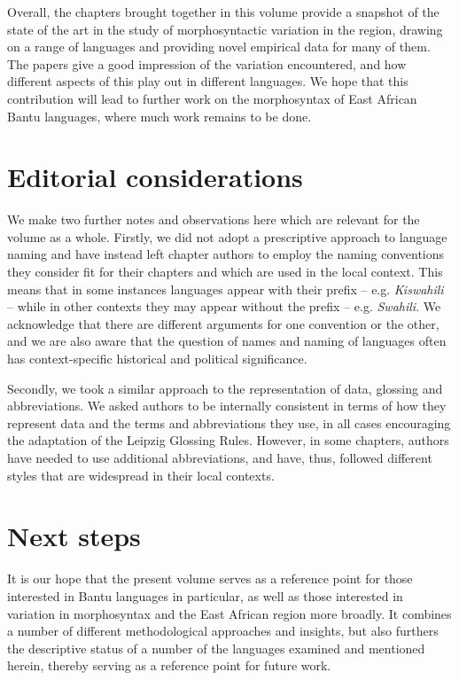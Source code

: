 \documentclass[output=paper]{langscibook}
\begin{document}
Overall, the chapters brought together in this volume provide a snapshot of the state of the art in the study of morphosyntactic variation in the region, drawing on a range of languages and providing novel empirical data for many of them. The papers give a good impression of the variation encountered, and how different aspects of this play out in different languages. We hope that this contribution will lead to further work on the morphosyntax of East African Bantu languages, where much work remains to be done. 

\section{Editorial considerations}\largerpage

We make two further notes and observations here which are relevant for the volume as a whole. Firstly, we did not adopt a prescriptive approach to language naming and have instead left chapter authors to employ the naming conventions they consider fit for their chapters and which are used in the local context. This means that in some instances languages appear with their prefix – e.g. \textit{Kiswahili} – while in other contexts they may appear without the prefix – e.g. \textit{Swahili}. We acknowledge that there are different arguments for one convention or the other, and we are also aware that the question of names and naming of languages often has context-specific historical and political significance.

Secondly, we took a similar approach to the representation of data, glossing and abbreviations. We asked authors to be internally consistent in terms of how they represent data and the terms and abbreviations they use, in all cases encouraging the adaptation of the Leipzig Glossing Rules. However, in some chapters, authors have needed to use additional abbreviations, and have, thus, followed different styles that are widespread in their local contexts.

\section{Next steps}

It is our hope that the present volume serves as a reference point for those interested in Bantu languages in particular, as well as those interested in variation in morphosyntax and the East African region more broadly. It combines a number of different methodological approaches and insights, but also furthers the descriptive status of a number of the languages examined and mentioned herein, thereby serving as a reference point \-for future work. 
\end{document}
